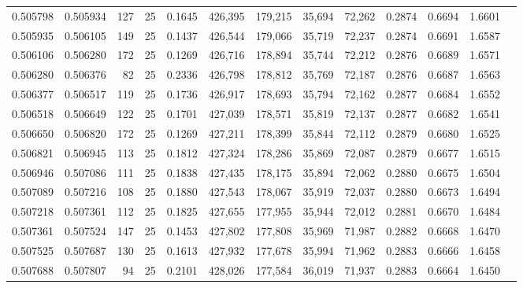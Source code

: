 \begin{tabular}{rrrrrrrrrrrrr}
0.505798 & 0.505934 &   127 &  25 &                                     0.1645 & 426,395 & 179,215 &  35,694 &  72,262 & 0.2874 & 0.6694 & 1.6601 \\
0.505935 & 0.506105 &   149 &  25 &                                     0.1437 & 426,544 & 179,066 &  35,719 &  72,237 & 0.2874 & 0.6691 & 1.6587 \\
0.506106 & 0.506280 &   172 &  25 &                                     0.1269 & 426,716 & 178,894 &  35,744 &  72,212 & 0.2876 & 0.6689 & 1.6571 \\
0.506280 & 0.506376 &    82 &  25 &                                     0.2336 & 426,798 & 178,812 &  35,769 &  72,187 & 0.2876 & 0.6687 & 1.6563 \\
0.506377 & 0.506517 &   119 &  25 &                                     0.1736 & 426,917 & 178,693 &  35,794 &  72,162 & 0.2877 & 0.6684 & 1.6552 \\
0.506518 & 0.506649 &   122 &  25 &                                     0.1701 & 427,039 & 178,571 &  35,819 &  72,137 & 0.2877 & 0.6682 & 1.6541 \\
0.506650 & 0.506820 &   172 &  25 &                                     0.1269 & 427,211 & 178,399 &  35,844 &  72,112 & 0.2879 & 0.6680 & 1.6525 \\
0.506821 & 0.506945 &   113 &  25 &                                     0.1812 & 427,324 & 178,286 &  35,869 &  72,087 & 0.2879 & 0.6677 & 1.6515 \\
0.506946 & 0.507086 &   111 &  25 &                                     0.1838 & 427,435 & 178,175 &  35,894 &  72,062 & 0.2880 & 0.6675 & 1.6504 \\
0.507089 & 0.507216 &   108 &  25 &                                     0.1880 & 427,543 & 178,067 &  35,919 &  72,037 & 0.2880 & 0.6673 & 1.6494 \\
0.507218 & 0.507361 &   112 &  25 &                                     0.1825 & 427,655 & 177,955 &  35,944 &  72,012 & 0.2881 & 0.6670 & 1.6484 \\
0.507361 & 0.507524 &   147 &  25 &                                     0.1453 & 427,802 & 177,808 &  35,969 &  71,987 & 0.2882 & 0.6668 & 1.6470 \\
0.507525 & 0.507687 &   130 &  25 &                                     0.1613 & 427,932 & 177,678 &  35,994 &  71,962 & 0.2883 & 0.6666 & 1.6458 \\
0.507688 & 0.507807 &    94 &  25 &                                     0.2101 & 428,026 & 177,584 &  36,019 &  71,937 & 0.2883 & 0.6664 & 1.6450 \\

\end{tabular}
